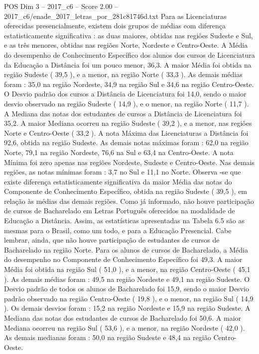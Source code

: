 \begin{textsample}{POS Dim 3 – 2017\_c6 – Score 2.00 – 2017\_c6/enade\_2017\_letras\_por\_281c81746d.txt}
Para as Licenciaturas oferecidas presencialmente, existem dois grupos de médias com diferença estatisticamente significativa : as duas maiores, obtidas nas regiões Sudeste e Sul, e as três menores, obtidas nas regiões Norte, Nordeste e Centro-Oeste.
A Média do desempenho de Conhecimento Específico dos alunos dos cursos de Licenciatura da Educação a Distância foi um pouco menor, 36,3.
A maior Média foi obtida na região Sudeste ( 39,5 ), e a menor, na região Norte ( 33,3 ).
As demais médias foram : 35,0 na região Nordeste, 34,9 na região Sul e 34,6 na região Centro-Oeste.
O Desvio padrão dos cursos a Distância de Licenciatura foi 14,0, sendo o maior desvio observado na região Sudeste ( 14,9 ), e o menor, na região Norte ( 11,7 ).
A Mediana das notas dos estudantes de cursos a Distância de Licenciatura foi 35,2.
A maior Mediana ocorreu na região Sudeste ( 39,2 ), e a menor, nas regiões Norte e Centro-Oeste ( 33,2 ).
A nota Máxima das Licenciaturas a Distância foi 92,6, obtida na região Sudeste.
As demais notas máximas foram : 62,0 na região Norte, 79,1 na região Nordeste, 76,6 na Sul e 63,4 na Centro-Oeste.
A nota Mínima foi zero apenas nas regiões Nordeste, Sudeste e Centro-Oeste.
Nas demais regiões, as notas mínimas foram : 3,7 no Sul e 11,1 no Norte.
Observa -se que existe diferença estatisticamente significativa da maior Média das notas do Componente de Conhecimento Específico, obtida na região Sudeste ( 39,5 ), em relação às médias das demais regiões.
Como já informado, não houve participação de cursos de Bacharelado em Letras Português oferecidos na modalidade de Educação a Distância.
Assim, as estatísticas apresentadas na Tabela 6.5 são as mesmas para o Brasil, como um todo, e para a Educação Presencial.
Cabe lembrar, ainda, que não houve participação de estudantes de cursos de Bacharelado na região Norte.
Para os alunos de cursos de Bacharelado, a Média do desempenho no Componente de Conhecimento Específico foi 49,3.
A maior Média foi obtida na região Sul ( 51,0 ), e a menor, na região Centro-Oeste ( 45,1 ).
As demais médias foram : 49,5 na região Nordeste e 49,1 na região Sudeste.
O Desvio padrão de todos os alunos de Bacharelado foi 15,9, sendo o maior Desvio padrão observado na região Centro-Oeste ( 19,8 ), e o menor, na região Sul ( 14,9 ).
Os demais desvios foram : 15,2 na região Nordeste e 15,9 na região Sudeste.
A Mediana das notas dos estudantes de cursos de Bacharelado foi 50,6.
A maior Mediana ocorreu na região Sul ( 53,6 ), e a menor, na região Nordeste ( 42,0 ).
As demais medianas foram : 50,0 na região Sudeste e 48,4 na região Centro-Oeste.

\end{textsample}
